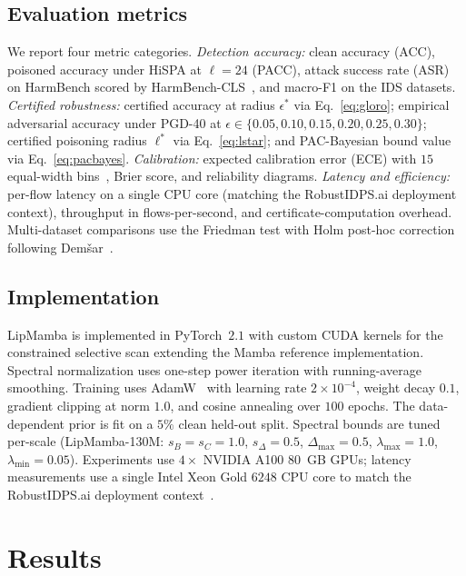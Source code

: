 \documentclass[12pt,a4paper]{article}
\theoremstyle{definition}
\theoremstyle{remark}
\newcommand{\modelname}{LipMamba}
\begin{document}
\subsection{Evaluation metrics}

We report four metric categories. \emph{Detection accuracy:} clean accuracy (ACC), poisoned accuracy under HiSPA at $\ell = 24$ (PACC), attack success rate (ASR) on HarmBench scored by HarmBench-CLS~\cite{mazeika2024harmbench}, and macro-F1 on the IDS datasets. \emph{Certified robustness:} certified accuracy at radius $\epsilon^*$ via Eq.~\eqref{eq:gloro}; empirical adversarial accuracy under PGD-40 at $\epsilon \in \{0.05, 0.10, 0.15, 0.20, 0.25, 0.30\}$; certified poisoning radius $\ell^*$ via Eq.~\eqref{eq:lstar}; and PAC-Bayesian bound value via Eq.~\eqref{eq:pacbayes}. \emph{Calibration:} expected calibration error (ECE) with $15$ equal-width bins~\cite{guo2017calibration}, Brier score, and reliability diagrams. \emph{Latency and efficiency:} per-flow latency on a single CPU core (matching the RobustIDPS.ai deployment context), throughput in flows-per-second, and certificate-computation overhead. Multi-dataset comparisons use the Friedman test with Holm post-hoc correction following Demšar~\cite{demsar2006statistical}.

\subsection{Implementation}

\modelname{} is implemented in PyTorch~$2.1$ with custom CUDA kernels for the constrained selective scan extending the Mamba reference implementation. Spectral normalization uses one-step power iteration with running-average smoothing. Training uses AdamW~\cite{loshchilov2019adamw} with learning rate $2 \times 10^{-4}$, weight decay $0.1$, gradient clipping at norm $1.0$, and cosine annealing over $100$ epochs. The data-dependent prior is fit on a $5\%$ clean held-out split. Spectral bounds are tuned per-scale (LipMamba-130M: $s_B = s_C = 1.0$, $s_\Delta = 0.5$, $\Delta_{\max} = 0.5$, $\lambda_{\max} = 1.0$, $\lambda_{\min} = 0.05$). Experiments use $4 \times$ NVIDIA A100 80~GB GPUs; latency measurements use a single Intel Xeon Gold $6248$ CPU core to match the RobustIDPS.ai deployment context~\cite{anaedevha2026robustidps}.


\section{Results}
\label{sec:results}
\end{document}
